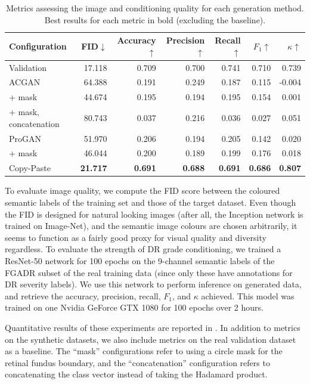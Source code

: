 \begin{table}[h]
    \centering
    \begin{tabular}{lrrrrrr}
    \toprule
        Configuration & FID$\downarrow$ & Accuracy$\uparrow$ & Precision$\uparrow$ & Recall$\uparrow$ & $F_1$$\uparrow$ & $\kappa$$\uparrow$ \\
    \midrule
        Validation & 17.118 & 0.709 & 0.700 & 0.741 & 0.710 & 0.739 \\
    \midrule
        ACGAN & 64.388 & 0.191 & 0.249 & 0.187 & 0.115 & -0.004 \\
        + mask & 44.674 & 0.195 & 0.194 & 0.195 & 0.154 & 0.001 \\
        + mask, concatenation & 80.743 & 0.037 & 0.216 & 0.036 & 0.027 & 0.051 \\
    \midrule
        ProGAN & 51.970 & 0.206 & 0.194 & 0.205 & 0.142 & 0.020 \\
        + mask & 46.044 & 0.200 & 0.189 & 0.199 & 0.176 & 0.018 \\
    \midrule
        Copy-Paste & \textbf{21.717} & \textbf{0.691} & \textbf{0.688} & \textbf{0.691} & \textbf{0.686} & \textbf{0.807} \\
    \bottomrule
    \end{tabular}
    \caption{Metrics assessing the image and conditioning quality for each generation method. Best results for each metric in bold (excluding the baseline).}
    \label{tab:acgan_results}
\end{table}

To evaluate image quality, we compute the FID score between the coloured semantic labels of the training set and those of the target dataset.
Even though the FID is designed for natural looking images (after all, the Inception network is trained on Image-Net), and the semantic image colours are chosen arbitrarily, it seems to function as a fairly good proxy for visual quality and diversity regardless.
To evaluate the strength of DR grade conditioning, we trained a ResNet-50 network for 100 epochs on the 9-channel semantic labels of the FGADR subset of the real training data (since only these have annotations for DR severity labels).
We use this network to perform inference on generated data, and retrieve the accuracy, precision, recall, $F_1$, and $\kappa$ achieved.
This model was trained on one Nvidia GeForce GTX 1080 for 100 epochs over 2 hours.

Quantitative results of these experiments are reported in .
In addition to metrics on the synthetic datasets, we also include metrics on the real validation dataset as a baseline.
The ``mask'' configurations refer to using a circle mask for the retinal fundus boundary, and the ``concatenation'' configuration refers to concatenating the class vector instead of taking the Hadamard product.

